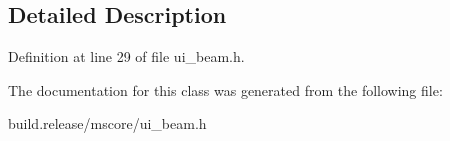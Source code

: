 \subsection{Detailed Description}


Definition at line 29 of file ui\+\_\+beam.\+h.



The documentation for this class was generated from the following file\+:\begin{DoxyCompactItemize}
\item 
build.\+release/mscore/ui\+\_\+beam.\+h\end{DoxyCompactItemize}
